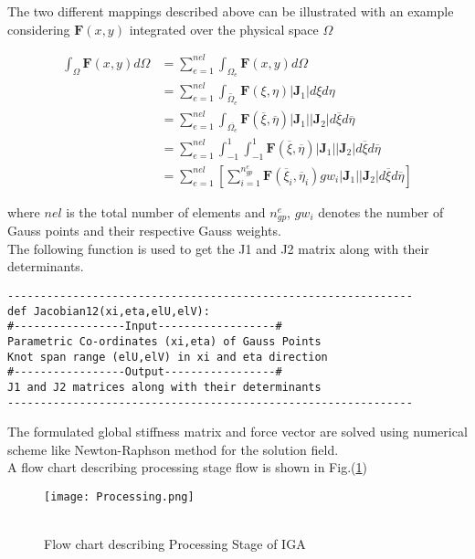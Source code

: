 \documentclass[11pt]{article}
\begin{document}
The two different mappings described above can be illustrated with an example
considering $ \textbf{F}(x,y)$ integrated over the physical space $\Omega$

\begin{equation*}
\begin{split}
\int_{\Omega} \textbf{F}(x,y)d\Omega & = \sum_{e=1}^{nel} \int_{\Omega_e}
\textbf{F}(x,y) d\Omega  \\
& = \sum_{e=1}^{nel} \int_{\widetilde{\Omega_e}}
\textbf{F}(\xi,\eta)|\textbf{J}_1| d\xi d\eta \\
& = \sum_{e=1}^{nel} \int_{\overline{\Omega_e}}
\textbf{F}(\overline\xi,\overline\eta)|\textbf{J}_1||\textbf{J}_2| d\overline\xi
d\overline\eta  \\
& = \sum_{e=1}^{nel} \int_{-1}^{1} \int_{-1}^{1}
\textbf{F}(\overline\xi,\overline\eta)|\textbf{J}_1||\textbf{J}_2| d\overline\xi
d\overline\eta  \\
& = \sum_{e=1}^{nel} \left[ \sum_{i=1}^{n_{gp}^e}
\textbf{F}(\overline\xi_i,\overline\eta_i) gw_i |\textbf{J}_1||\textbf{J}_2|
d\overline\xi d\overline\eta \right]
\end{split}
\end{equation*}

\noindent
where $nel$ is the total number of elements and $n_{gp}^e$, $gw_i$ denotes the
number of Gauss points and their respective Gauss weights.\\
\noindent
The following function is used to get the J1 and J2 matrix along with their determinants.
\begin{verbatim}
--------------------------------------------------------------
def Jacobian12(xi,eta,elU,elV):
#-----------------Input------------------#
Parametric Co-ordinates (xi,eta) of Gauss Points
Knot span range (elU,elV) in xi and eta direction
#-----------------Output-----------------#
J1 and J2 matrices along with their determinants
--------------------------------------------------------------
\end{verbatim}
The formulated global stiffness matrix and force vector are solved using
numerical scheme like Newton-Raphson method for the solution field.
\\A flow chart describing processing stage flow is shown in Fig.(\ref{Processing})
\begin{figure}[H]
	\begin{center}
		\texttt{[image: Processing.png]} 
		\caption{\\Flow chart describing Processing Stage of IGA}\label{Processing}
	\end{center}
\end{figure}
\end{document}
